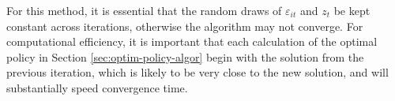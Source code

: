 \documentclass[a4paper,12pt]{article}
\newcommand{\eps}{\varepsilon}
\numberwithin{equation}{section}
\theoremstyle{definition}
\begin{document}
For this method, it is essential that the random draws of $\eps_{it}$ and $z_t$ be kept constant across iterations, otherwise the algorithm may not converge. For computational efficiency, it is important that each calculation of the optimal policy in Section \ref{sec:optim-policy-algor} begin with the solution from the previous iteration, which is likely to be very close to the new solution, and will substantially speed convergence time.
\end{document}
